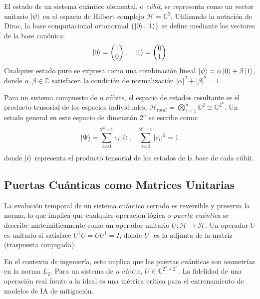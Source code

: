 El estado de un sistema cuántico elemental, o \textit{cúbit}, se representa como un vector unitario $\ket{\psi}$ en el espacio de Hilbert complejo $\mathcal{H} = \mathbb{C}^2$. Utilizando la notación de Dirac, la base computacional ortonormal $\{\ket{0}, \ket{1}\}$ se define mediante los vectores de la base canónica:
\begin{equation}
\ket{0} = \begin{pmatrix} 1 \\ 0 \end{pmatrix}, \quad \ket{1} = \begin{pmatrix} 0 \\ 1 \end{pmatrix}
\end{equation}
Cualquier estado puro se expresa como una combinación lineal $\ket{\psi} = \alpha\ket{0} + \beta\ket{1}$, donde $\alpha, \beta \in \mathbb{C}$ satisfacen la condición de normalización $|\alpha|^2 + |\beta|^2 = 1$.

Para un sistema compuesto de $n$ cúbits, el espacio de estados resultante es el producto tensorial de los espacios individuales, $\mathcal{H}_{total} = \bigotimes_{i=1}^{n} \mathbb{C}^2 \cong \mathbb{C}^{2^n}$. Un estado general en este espacio de dimensión $2^n$ se escribe como:
\begin{equation}
\ket{\Psi} = \sum_{i=0}^{2^n-1} c_i \ket{i}, \quad \sum_{i=0}^{2^n-1} |c_i|^2 = 1
\end{equation}
donde $\ket{i}$ representa el producto tensorial de los estados de la base de cada cúbit.

\subsection{Puertas Cuánticas como Matrices Unitarias}

La evolución temporal de un sistema cuántico cerrado es reversible y preserva la norma, lo que implica que cualquier operación lógica o \textit{puerta cuántica} se describe matemáticamente como un operador unitario $U: \mathcal{H} \to \mathcal{H}$. Un operador $U$ es unitario si satisface $U^{\dagger}U = UU^{\dagger} = I$, donde $U^{\dagger}$ es la adjunta de la matriz (traspuesta conjugada).

En el contexto de ingeniería, esto implica que las puertas cuánticas son isometrías en la norma $L_2$. Para un sistema de $n$ cúbits, $U \in \mathbb{C}^{2^n \times 2^n}$. La fidelidad de una operación real frente a la ideal es una métrica crítica para el entrenamiento de modelos de IA de mitigación.

